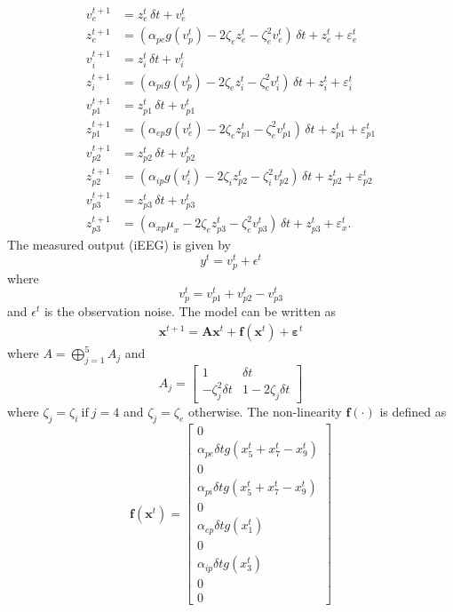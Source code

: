 \documentclass[]{article}
\begin{document}
\begin{align}
	v_e^{t+1} &= z_e^{t}\,\delta t + v_e^{t}\\
	z_e^{t+1} &= (\alpha_{pe}g\left(v_p^{t}\right) - 2\zeta_{e}z_e^{t} - \zeta_{e}^2v_e^{t})\,\delta t + z_e^{t} + \varepsilon_e^{t} \\
	v_i^{t+1} &= z_i^{t}\,\delta t + v_i^{t}\\
	z_i^{t+1} &= \left(\alpha_{pi}g\left(v_p^{t}\right) - 2\zeta_{e}z_i^{t} - \zeta_{e}^2v_i^{t}\right)\,\delta t + z_i^{t} + \varepsilon_i^{t}\\
	v_{p1}^{t+1} &= z_{p1}^{t}\,\delta t + v_{p1}^{t} \\
	z_{p1}^{t+1} &= (\alpha_{ep}g\left(v_e^{t}\right) - 2\zeta_{e}z_{p1}^{t}- \zeta_{e}^2v_{p1}^{t})\,\delta t + z_{p1}^{t} + \varepsilon_{p1}^{t}\\
	v_{p2}^{t+1} &= z_{p2}^{t}\,\delta t + v_{p2}^{t} \\
	z_{p2}^{t+1} &= (\alpha_{ip}g\left(v_i^{t}\right) - 2\zeta_{i}z_{p2}^{t} - \zeta_{i}^2v_{p2}^{t})\,\delta t + z_{p2}^{t} + \varepsilon_{p2}^{t} \\
	v_{p3}^{t+1} &= z_{p3}^{t}\,\delta t + v_{p3}^{t} \\
	z_{p3}^{t+1} &= (\alpha_{xp}\mu_x - 2\zeta_{e}z_{p3}^{t} - \zeta_{e}^2v_{p3}^{t})\,\delta t + z_{p3}^{t} + \varepsilon_x^{t}.
\end{align} 
The measured output (iEEG) is given by
\begin{equation}
 y^{t}=v_p^{t}+\epsilon^{t}
\end{equation}
where
\begin{equation}
 v_p^{t}=v_{p1}^{t}+v_{p2}^{t}-v_{p3}^{t}  
	\end{equation}  
and $\epsilon^{t}$ is the observation noise.
The model can be written as
\begin{align}
	\mathbf{x}^{t+1} = \mathbf{A}\mathbf{x}^t + \mathbf{f}(\mathbf{x}^t) + \boldsymbol{\varepsilon}^t
\end{align} 
where $A=\bigoplus_{j=1}^5A_j$
and
\begin{equation}
	A_j=\begin{bmatrix}1&\delta t\\-\zeta_j^2\delta t&1-2\zeta_j\delta t\end{bmatrix}
\end{equation} 
where $\zeta_j=\zeta_i~\text{if}~j=4$ and $\zeta_j=\zeta_e$ otherwise. The non-linearity $\mathbf f(\cdot)$ is defined as
\begin{equation}
 \mathbf{f}(\mathbf{x}^t)= \begin{bmatrix}0\\ \alpha_{pe}\delta t g\left(x_{5}^{t}+x_{7}^{t}-x_{9}^{t}\right)\\0\\\alpha_{pi}\delta t g\left(x_{5}^{t}+x_{7}^{t}-x_{9}^{t}\right)\\0\\\alpha_{ep}\delta t g\left(x_1^{t}\right)\\0\\\alpha_{ip}\delta t g\left(x_3^{t}\right)\\0\\0\end{bmatrix}
\end{equation}  
\end{document}
